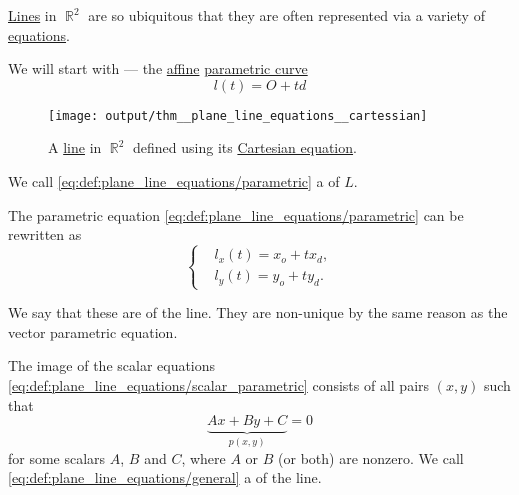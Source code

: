 \begin{definition}\label{def:plane_line_equations}
  \hyperref[def:affine_line]{Lines} in \( \BbbR^2 \) are so ubiquitous that they are often represented via a variety of \hyperref[ex:equations]{equations}.

  We will start with  --- the \hyperref[def:affine_operator]{affine} \hyperref[def:parametric_curve]{parametric curve}
  \begin{equation}\label{eq:def:plane_line_equations/parametric}
    l(t) = O + td
  \end{equation}

  \begin{figure}[!ht]
    \centering
    \texttt{[image: output/thm\_\_plane\_line\_equations\_\_cartessian]}
    \caption{A \hyperref[def:affine_line]{line} in \( \BbbR^2 \) defined using its \hyperref[def:plane_line_equations/cartesian]{Cartesian equation}.}\label{fig:def:plane_line_equations/cartesian}
  \end{figure}

  \begin{thmenum}
     We call \eqref{eq:def:plane_line_equations/parametric} a  of \( L \).

    \medspace

     The parametric equation \eqref{eq:def:plane_line_equations/parametric} can be rewritten as
    \begin{equation}\label{eq:def:plane_line_equations/scalar_parametric}
      \begin{cases}
         &l_x(t) = x_o + t x_d, \\
         &l_y(t) = y_o + t y_d.
      \end{cases}
    \end{equation}

    We say that these are  of the line. They are non-unique by the same reason as the vector parametric equation.

     The image of the scalar equations \eqref{eq:def:plane_line_equations/scalar_parametric} consists of all pairs \( (x, y) \) such that
    \begin{equation}\label{eq:def:plane_line_equations/general}
      \underbrace{ Ax + By + C }_{ p(x, y) } = 0
    \end{equation}
    for some scalars \( A \), \( B \) and \( C \), where \( A \) or \( B \) (or both) are nonzero.
    We call \eqref{eq:def:plane_line_equations/general} a  of the line.


\end{thmenum}
\end{definition}
